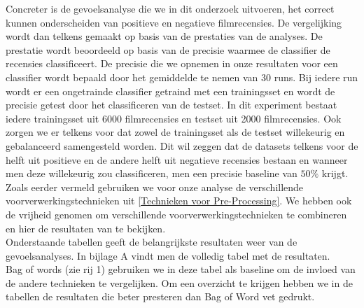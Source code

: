 Concreter is de gevoelsanalyse die we in dit onderzoek uitvoeren, het correct kunnen onderscheiden van positieve en negatieve filmrecensies. De vergelijking wordt dan telkens gemaakt op basis van de prestaties van de analyses. De prestatie wordt beoordeeld op basis van de precisie waarmee de classifier de recensies classificeert. De precisie die we opnemen in onze resultaten voor een classifier wordt bepaald door het gemiddelde te nemen van 30 runs. Bij iedere run wordt er een ongetrainde classifier getraind met een trainingsset en wordt de precisie getest door het classificeren van de testset. In dit experiment bestaat iedere trainingsset uit 6000 filmrecensies en testset uit 2000 filmrecensies. Ook zorgen we er telkens voor dat zowel de trainingsset als de testset willekeurig en gebalanceerd samengesteld worden. Dit wil zeggen dat de datasets telkens voor de helft uit positieve en de andere helft uit negatieve recensies bestaan en wanneer men deze willekeurig zou classificeren, men een precisie baseline van $50\%$ krijgt.\\

Zoals eerder vermeld gebruiken we voor onze analyse de verschillende voorverwerkingstechnieken uit \ref{Technieken voor Pre-Processing}. We hebben ook de vrijheid genomen om verschillende voorverwerkingstechnieken te combineren en hier de resultaten van te bekijken.\\
Onderstaande tabellen geeft de belangrijkste resultaten weer van de gevoelsanalyses. In bijlage A vindt men de volledig tabel met de resultaten. \\ 
Bag of words (zie rij 1) gebruiken we in deze tabel als baseline om de invloed van de andere technieken te vergelijken. Om een overzicht te krijgen hebben we in de tabellen de resultaten die beter presteren dan Bag of Word vet gedrukt. 

